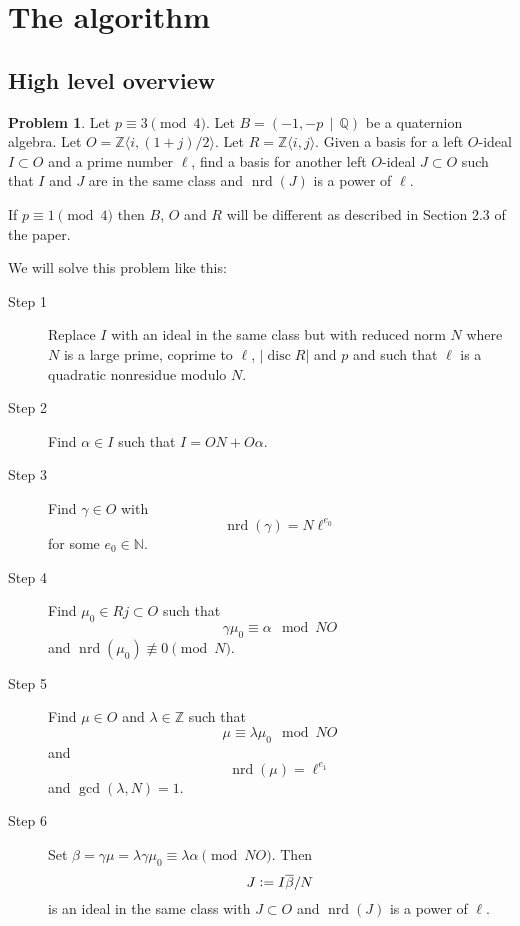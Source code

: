 \documentclass[10pt]{article}
\theoremstyle{plain}
\theoremstyle{definition}
\newtheorem{prob}[theorem]{Problem}
\newcommand{\op}{\operatorname}
\newcommand{\N}{\mathbb{N}}
\newcommand{\Z}{\mathbb{Z}}
\newcommand{\Q}{\mathbb{Q}}
\newcommand{\nrd}{\op{nrd}}
\newcommand{\disc}{\op{disc}}
\begin{document}
\section{The algorithm}
\subsection{High level overview}

\begin{prob}
    Let \( p \equiv 3 \pmod{4} \).
    Let \( B =  (-1, -p \, \mid \, \Q) \) be a quaternion algebra.
    Let \( O = \Z \langle i, (1+j) / 2 \rangle \).
    Let \( R = \Z \langle i , j \rangle \).
    Given a basis for a left \( O \)-ideal \( I \subset O \) and a prime number \( \ell \), find a basis for another left \( O \)-ideal \( J \subset O \) such that \( I \) and \( J \) are in the same class and \( \nrd(J) \) is a power of \( \ell \).
\end{prob}

If \( p \equiv 1 \pmod{4} \) then \( B \), \( O \) and \( R \) will be different as described in Section 2.3 of the paper.

We will solve this problem like this:
\begin{description}
    \item[Step 1]
    Replace \( I \) with an ideal in the same class but with reduced norm \( N \) where \( N \) is a large prime, coprime to \( \ell \), \( |\disc R| \) and \( p \) and such that \( \ell \) is a quadratic nonresidue modulo \( N \).
    \item[Step 2]
    Find \( \alpha \in I \) such that \( I = ON + O\alpha \).
    \item[Step 3]
    Find \( \gamma \in O \) with \[ \nrd(\gamma) = N \ell^{e_0} \] for some \( e_0 \in \N \).
    \item[Step 4]
    Find \( \mu_0 \in Rj \subset  O \) such that \[ \gamma\mu_0 \equiv \alpha \mod NO \] and \( \nrd(\mu_0) \not\equiv 0 \pmod{N} \).
    \item[Step 5]
    Find \( \mu \in  O \) and \( \lambda \in \Z \) such that \[ \mu \equiv \lambda \mu_0 \mod NO \] and \[ \nrd(\mu) = \ell^{e_1} \] and \( \gcd(\lambda, N) = 1 \).
    \item[Step 6]
    Set \( \beta = \gamma \mu = \lambda\gamma\mu_0 \equiv \lambda \alpha \pmod{NO} \).
    Then \[ J \vcentcolon = I\overline{\beta}/N \] is an ideal in the same class with \( J \subset O \) and \( \nrd(J) \) is a power of \( \ell \).
\end{description}
\end{document}
